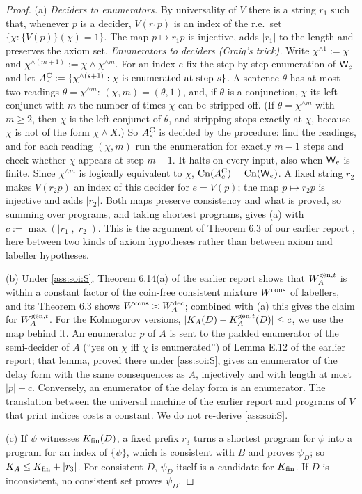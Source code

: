 \begin{proof}
(a) \emph{Deciders to enumerators.} By universality of $V$ there is a string $r_1$ such that, whenever $p$ is a decider, $V(r_1p)$ is an index of the r.e.\ set $\{\chi:\{V(p)\}(\chi)=1\}$. The map $p\mapsto r_1p$ is injective, adds $\lvert r_1\rvert$ to the length and preserves the axiom set.
\emph{Enumerators to deciders (Craig's trick).} Write $\chi^{\wedge1}:=\chi$ and $\chi^{\wedge(m+1)}:=\chi\wedge\chi^{\wedge m}$. For an index $e$ fix the step-by-step enumeration of $\mathsf{W}_{e}$ and let $A^{\rm C}_e:=\{\chi^{\wedge(s+1)}:\chi\text{ is enumerated at step }s\}$. A sentence $\theta$ has at most two readings $\theta=\chi^{\wedge m}$: $(\chi,m)=(\theta,1)$, and, if $\theta$ is a conjunction, $\chi$ its left conjunct with $m$ the number of times $\chi$ can be stripped off. (If $\theta=\chi^{\wedge m}$ with $m\ge2$, then $\chi$ is the left conjunct of $\theta$, and stripping stops exactly at $\chi$, because $\chi$ is not of the form $\chi\wedge X$.) So $A^{\rm C}_e$ is decided by the procedure: find the readings, and for each reading $(\chi,m)$ run the enumeration for exactly $m-1$ steps and check whether $\chi$ appears at step $m-1$. It halts on every input, also when $\mathsf{W}_{e}$ is finite. Since $\chi^{\wedge m}$ is logically equivalent to $\chi$, $\mathrm{Cn}(A^{\rm C}_e)=\mathrm{Cn}(\mathsf{W}_{e})$. A fixed string $r_2$ makes $V(r_2p)$ an index of this decider for $e=V(p)$; the map $p\mapsto r_2p$ is injective and adds $\lvert r_2\rvert$. Both maps preserve consistency and what is proved, so summing over programs, and taking shortest programs, gives (a) with $c:=\max(\lvert r_1\rvert,\lvert r_2\rvert)$. This is the argument of Theorem 6.3 of our earlier report \citep{claude2026axiominduction}, here between two kinds of axiom hypotheses rather than between axiom and labeller hypotheses.

(b) Under \cref{ass:soi:S}, Theorem 6.14(a) of the earlier report shows that $W_{A}^{\mathrm{gen},t}$ is within a constant factor of the coin-free consistent mixture $W^{\mathrm{cons}}$ of labellers, and its Theorem 6.3 shows $W^{\mathrm{cons}}\asymp W_{A}^{\mathrm{dec}}$; combined with (a) this gives the claim for $W_{A}^{\mathrm{gen},t}$. For the Kolmogorov versions, $\lvert K_{A}(D)-K_A^{\mathrm{gen},t}(D)\rvert\le c$, we use the map behind it. An enumerator $p$ of $A$ is sent to the padded enumerator of the semi-decider of $A$ (``yes on $\chi$ iff $\chi$ is enumerated'') of Lemma E.12 of the earlier report; that lemma, proved there under \cref{ass:soi:S}, gives an enumerator of the delay form with the same consequences as $A$, injectively and with length at most $\lvert p\rvert+c$. Conversely, an enumerator of the delay form is an enumerator. The translation between the universal machine of the earlier report and programs of $V$ that print indices costs a constant. We do not re-derive \cref{ass:soi:S}.

(c) If $\psi$ witnesses $K_{\mathrm{fin}}(D)$, a fixed prefix $r_3$ turns a shortest program for $\psi$ into a program for an index of $\{\psi\}$, which is consistent with $B$ and proves $\psi_D$; so $K_{A}\le K_{\mathrm{fin}}+\lvert r_3\rvert$. For consistent $D$, $\psi_D$ itself is a candidate for $K_{\mathrm{fin}}$. If $D$ is inconsistent, no consistent set proves $\psi_D$.
\end{proof}

